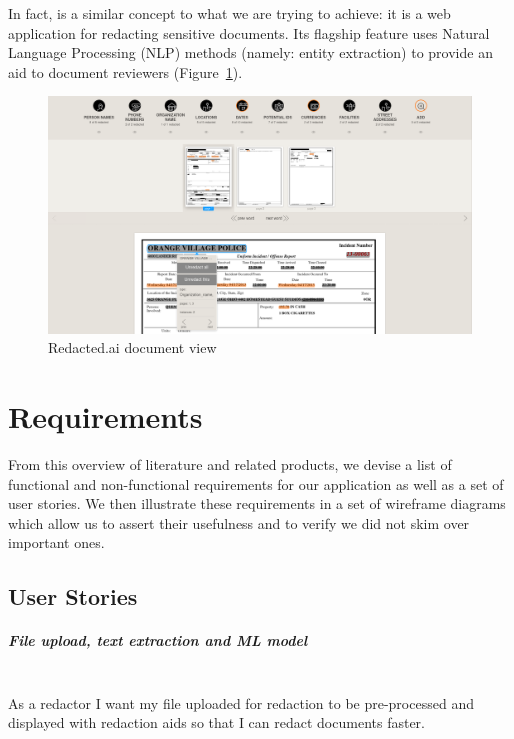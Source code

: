 \documentclass[\version]{l4proj}
\begin{document}
In fact, \textcite{RedactedAIRemovea} is a similar concept to what we are trying to achieve: it is a web application for redacting sensitive documents. Its flagship feature uses Natural Language Processing (NLP) methods (namely: entity extraction) to provide an aid to document reviewers (Figure~\ref{fig:redactedai}).

\begin{figure}[H]
    \centering
    \includegraphics[width=0.9\linewidth]{images/related_products/redactedai.png}
    \caption{Redacted.ai document view}\label{fig:redactedai}
\end{figure}

\chapter{Requirements}

From this overview of literature and related products, we devise a list of functional and non-functional requirements for our application as well as a set of user stories.
We then illustrate these requirements in a set of wireframe diagrams which allow us to assert their usefulness and to verify we did not skim over important ones.

\section{User Stories}

\paragraph*{File upload, text extraction and ML model}\mbox{}\\
As a redactor I want my file uploaded for redaction to be pre-processed and displayed with redaction aids so that I can redact documents faster.
\end{document}
